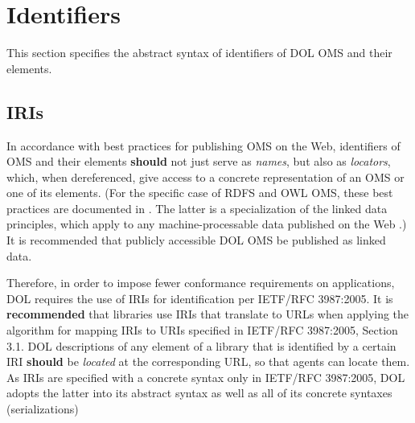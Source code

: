 \documentclass[10pt,fleqn,%
\ifpretendfinal
final%
\else
draft%
\fi,
]{scrreprt}
\makeatletter
\newcommand*\CommentAuthor{}
\renewcommand*\CommentAuthor{#1}}
\newcommand*\CommentDate{}
\renewcommand*\CommentDate{#1}}
\newcommand*\CommentId{}
\renewcommand*\CommentId{#1}}
\newcommand*\CommentType{}
\renewcommand*\CommentType{#1}}
\newcommand*{\SetCommentColorByType}[1]{%
\edef\localType{{#1}}%
\expandafter\ifstrequal\localType{q-aut}{\colorlet{CommentColor}{red}}{%
\expandafter\ifstrequal\localType{q-all}{\colorlet{CommentColor}{orange}}{%
\expandafter\ifstrequal\localType{todo}{\colorlet{CommentColor}{orange}}{%
\expandafter\ifstrequal\localType{fyi}{\colorlet{CommentColor}{lightgray}}{%
\colorlet{CommentColor}{yellow}}}}}}
\newcommand*{\SetCommentPrefixByType}[1]{%
\edef\localType{{#1}}%
\expandafter\@ifmtarg\localType{%
\edef\CommentPrefix{}%
}{%
\caseupper[q]{#1}%
\edef\CommentPrefix{\thestring: }%
}}
\newcommand*{\initComment}[1]{%
\setkeys{Comment}{#1}%
\SetCommentColorByType{\CommentType}%
\relax%
\SetCommentPrefixByType{\CommentType}%
\relax%
}
\newcommand*{\todonote}[2][]{%
\initComment{#1}%
\pdfcomment[author=\CommentAuthor,color=CommentColor,date=\CommentDate,id=\CommentId]{%
\CommentPrefix
#2}}
\renewcommand*{\todonote}[2][]{%
\initComment{#1}%
\ednote{\CommentPrefix #2}}
\newcommand*{\CLnote}[2][author=Christoph Lange]{%
\todonote[author=Christoph Lange,#1]{#2} 
}
\newcommand*{\recommended}{\textbf{recommended}\xspace}
\newcommand*{\should}{\textbf{should}\xspace}
\newcommand*{\IS}{OMG Specification\xspace}
\newcommand{\sclause}[1]{\section{#1}}
\newcommand{\ssclause}[1]{\subsection{#1}}
\newcommand{\nisref}[1]{#1}
\makeatother
\begin{document}


\sclause{Identifiers}\label{c:identifiers}

This section specifies the abstract syntax of identifiers of DOL OMS and their elements.

\ssclause{IRIs}\label{c:iris}

In accordance with best practices for publishing OMS on the Web, identifiers of OMS and their 
elements \should not just serve as \emph{names}, but also as \emph{locators}, which, when 
dereferenced, give access to a concrete representation of an OMS or one of its elements.  (For the 
specific case of RDFS and OWL OMS, these best practices are documented in 
\cite{W3C:NOTE-swbp-vocab-pub-20080828}.  The latter is a specialization of the linked data 
principles, which apply to any machine-processable data published on the Web 
\cite{BernersLee:LinkedData2006}.)  It is recommended that publicly accessible DOL OMS be published 
as linked data.

Therefore, in order to impose fewer conformance requirements on applications, DOL requires the use of
 IRIs for identification per \nisref{IETF/RFC 3987:2005}.
  It is \recommended that libraries use 
IRIs that translate to URLs when applying the algorithm for mapping IRIs to URIs specified in 
\nisref{IETF/RFC 3987:2005, Section 3.1}.  DOL descriptions of any element of a library that is 
identified by a certain IRI \should be \emph{located} at the corresponding URL, so that agents can 
locate them.  As IRIs are specified with a concrete syntax only in \nisref{IETF/RFC 3987:2005}, DOL 
adopts the latter into its abstract syntax as well as all of its concrete syntaxes 
(serializations)

\end{document}
